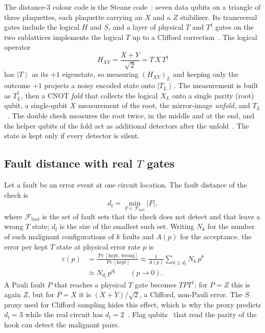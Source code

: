 \documentclass[aps,pra,reprint,superscriptaddress,longbibliography]{revtex4-2}
\newcommand{\ket}[1]{\left|#1\right\rangle}
\newcommand{\HXY}{H_{XY}}
\newcommand{\df}{d_{\mathrm{f}}}
\begin{document}
The distance-3 colour code is the Steane code~\cite{Steane1996}: seven data qubits on a triangle of three plaquettes, each plaquette carrying an $X$ and a $Z$ stabiliser.
Its transversal gates include the logical $H$ and $S$, and a layer of physical $T$ and $T^\dagger$ gates on the two sublattices implements the logical $T$ up to a Clifford correction~\cite{BombinMartinDelgado2006,Gidney2024cultivation}.
The logical operator
\begin{equation}
\HXY = \frac{X+Y}{\sqrt{2}} = T\,X\,T^\dagger
\end{equation}
has $\ket{T}$ as its $+1$ eigenstate, so measuring $(\HXY)_L$ and keeping only the outcome $+1$ projects a noisy encoded state onto $\ket{T_L}$.
The measurement is built as $T_L^\dagger$, then a CNOT \emph{fold} that collects the logical $X_L$ onto a single parity (root) qubit, a single-qubit $X$ measurement of the root, the mirror-image \emph{unfold}, and $T_L$~\cite{Gidney2024cultivation}.
The double check measures the root twice, in the middle and at the end, and the helper qubits of the fold act as additional detectors after the unfold~\cite{Rosenfeld2025}.
The state is kept only if every detector is silent.

\subsection{Fault distance with real $T$ gates}

Let a fault be an error event at one circuit location.
The fault distance of the check is
\begin{equation}
\df = \min_{F\in\mathcal{F}_{\mathrm{bad}}} |F|,
\label{eq:df}
\end{equation}
where $\mathcal{F}_{\mathrm{bad}}$ is the set of fault sets that the check does not detect and that leave a wrong $T$ state; $\df$ is the size of the smallest such set.
Writing $N_k$ for the number of such malignant configurations of $k$ faults and $A(p)$ for the acceptance, the error per kept $T$ state at physical error rate $p$ is
\begin{align}
\varepsilon(p) &= \frac{\Pr[\text{kept, wrong}]}{\Pr[\text{kept}]}
  \approx \frac{1}{A(p)} \sum_{k\ge \df} N_k\,p^k \nonumber\\
&\approx N_{\df}\,p^{\df} \qquad (p\to 0).
\label{eq:eps}
\end{align}
A Pauli fault $P$ that reaches a physical $T$ gate becomes $T P T^\dagger$; for $P=Z$ this is again $Z$, but for $P=X$ it is $(X+Y)/\sqrt2$, a Clifford, non-Pauli error.
The $S$ proxy used for Clifford sampling hides this effect, which is why the proxy predicts $\df=3$ while the real circuit has $\df=2$~\cite{Chan2026diagnosing,WanZapirain2026}.
Flag qubits~\cite{ChaoReichardt2018,ChamberlandBeverland2018} that read the parity of the hook can detect the malignant pairs.
\end{document}
